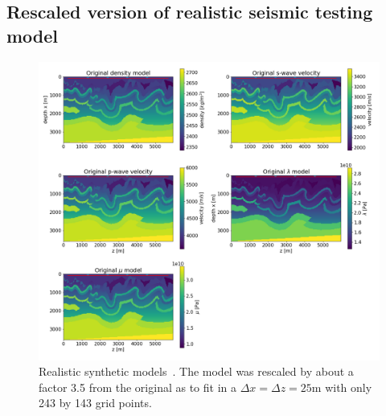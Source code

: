 \documentclass[10pt]{SelfArx} %
\theoremstyle{definition}
\begin{document}
\subsection{Rescaled version of realistic seismic testing model}
\begin{figure}[!h]\label{fig:cps_model}
\hspace*{-0.4in}
\includegraphics[width=1.15\textwidth]{fig/cana_models.png}
\caption{Realistic synthetic models~\cite{Gray1995}. The model was rescaled by about a factor 3.5 from the original as to fit in a $\Delta x = \Delta z =25$m with only 243 by 143 grid points.}
\end{figure}
\end{document}
